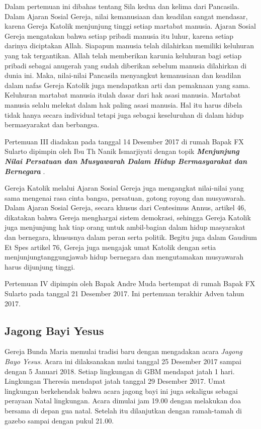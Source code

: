 Dalam pertemuan ini dibahas tentang Sila kedua dan kelima dari Pancasila. Dalam Ajaran Sosial Gereja, nilai kemanusiaan dan
keadilan sangat mendasar, karena Gereja Katolik
menjunjung tinggi setiap martabat manusia. Ajaran Sosial Gereja mengatakan bahwa setiap pribadi manusia itu
luhur, karena setiap darinya diciptakan Allah. Siapapun
manusia telah dilahirkan memiliki keluhuran yang tak
tergantikan. Allah telah memberikan karunia keluhuran
bagi setiap pribadi sebagai anugerah yang sudah diberikan
sebelum manusia dilahirkan di dunia ini. Maka, nilai-nilai
Pancasila menyangkut kemanusiaan dan keadilan dalam
nafas Gereja Katolik juga mendapatkan arti dan
pemaknaan yang sama. Keluhuran martabat manusia
itulah dasar dari hak asasi manusia. Martabat manusia
selalu melekat dalam hak paling asasi manusia. Hal itu
harus dibela tidak hanya secara individual tetapi juga
sebagai keseluruhan di dalam hidup bermasyarakat dan
berbangsa.


Pertemuan III diadakan pada tanggal 14 Desember 2017 di rumah Bapak FX Sularto dipimpin oleh Ibu Th Nanik Ismarjiyati dengan topik \textit{\textbf{Menjunjung Nilai Persatuan dan
		Musyawarah Dalam Hidup
		Bermasyarakat dan Bernegara
}}.
	
Gereja Katolik melalui Ajaran Sosial Gereja juga
mengangkat nilai-nilai yang sama mengenai rasa cinta
bangsa, persatuan, gotong royong dan musyawarah.
Dalam Ajaran Sosial Gereja, secara khusus dari Centesimus Annus, artikel 46, dikatakan bahwa Gereja
menghargai sistem demokrasi, sehingga Gereja Katolik
juga menjunjung hak tiap orang untuk ambil-bagian dalam
hidup masyarakat dan bernegara, khususnya dalam peran
serta politik. Begitu juga dalam Gaudium Et Spes artikel
76, Gereja juga mengajak umat Katolik dengan setia
menjunjungtanggungjawab hidup bernegara dan
mengutamakan musyawarah harus dijunjung tinggi.

Pertemuan IV dipimpin oleh Bapak Andre Muda bertempat di rumah Bapak FX Sularto pada tanggal 21 Desember 2017. Ini pertemuan terakhir Adven tahun 2017.	
	
\subsection*{Jagong Bayi Yesus}
Gereja Bunda Maria memulai tradisi baru dengan mengadakan acara \textit{Jagong Bayo Yesus}. Acara ini dilaksanakan mulai tanggal 25 Desember 2017 sampai dengan 5 Januari 2018. Setiap lingkungan di GBM mendapat jatah 1 hari. Lingkungan Theresia mendapat jatah tanggal 29 Desember 2017. Umat lingkungan berkehendak bahwa acara jagong bayi ini juga sekaligus sebagai perayaan Natal lingkungan. Acara dimulai jam 19.00 dengan melakukan doa bersama di depan gua natal. Setelah itu dilanjutkan dengan ramah-tamah di gazebo sampai dengan pukul 21.00.	

